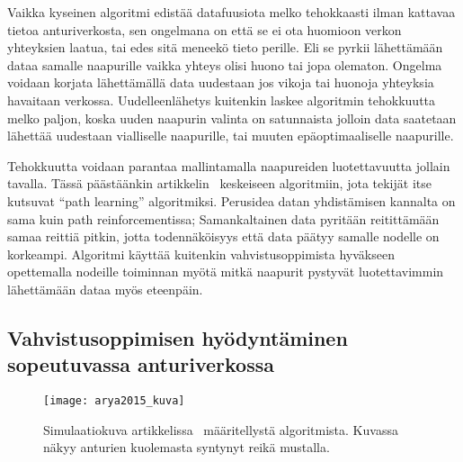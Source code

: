 Vaikka kyseinen algoritmi edistää datafuusiota melko tehokkaasti ilman kattavaa
tietoa anturiverkosta, sen ongelmana on että se ei ota huomioon verkon
yhteyksien laatua, tai edes sitä meneekö tieto perille. Eli se pyrkii
lähettämään dataa samalle naapurille vaikka yhteys olisi huono tai jopa
olematon. Ongelma voidaan korjata lähettämällä data uudestaan jos vikoja tai
huonoja yhteyksia havaitaan verkossa. Uudelleenlähetys kuitenkin laskee
algoritmin tehokkuutta melko paljon, koska uuden naapurin valinta on
satunnaista jolloin data saatetaan lähettää uudestaan vialliselle naapurille,
tai muuten epäoptimaaliselle naapurille.

Tehokkuutta voidaan parantaa mallintamalla naapureiden luotettavuutta jollain
tavalla. Tässä päästäänkin artikkelin~\cite{Yu2006} keskeiseen algoritmiin,
jota tekijät itse kutsuvat ``path learning'' algoritmiksi. Perusidea datan
yhdistämisen kannalta on sama kuin path reinforcementissa; Samankaltainen data
pyritään reitittämään samaa reittiä pitkin, jotta todennäköisyys että data
päätyy samalle nodelle on korkeampi. Algoritmi käyttää kuitenkin
vahvistusoppimista hyväkseen opettemalla nodeille toiminnan myötä mitkä
naapurit pystyvät luotettavimmin lähettämään dataa myös eteenpäin.


\subsection{Vahvistusoppimisen hyödyntäminen sopeutuvassa anturiverkossa}


\begin{figure}[h]
  \centering
  \texttt{[image: arya2015\_kuva]}
  \caption{Simulaatiokuva artikkelissa~\cite{Arya2015} määritellystä
algoritmista. Kuvassa näkyy anturien kuolemasta syntynyt reikä mustalla.}
\label{fig:arya2015}
\end{figure}

